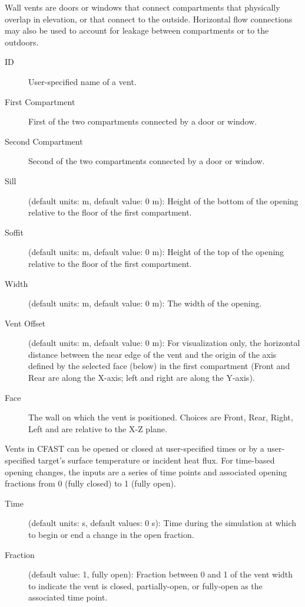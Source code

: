 Wall vents are doors or windows that connect compartments that physically overlap in elevation, or that connect to the outside. Horizontal flow connections may also be used to account for leakage between compartments or to the outdoors.

\begin{description}
\item[ID] User-specified name of a vent.
\item[First Compartment] First of the two compartments connected by a door or window.
\item[Second Compartment] Second of the two compartments connected by a door or window.
\item[Sill] (default units: m, default value: 0 m): Height of the bottom of the opening relative to the floor of the first compartment.
\item[Soffit] (default units: m, default value: 0 m): Height of the top of the opening relative to the floor of the first compartment.
\item[Width] (default units: m, default value: 0 m): The width of the opening.
\item[Vent Offset] (default units: m, default value: 0 m): For visualization only, the horizontal distance between the near edge of the vent and the origin of the axis defined by the selected face (below) in the first compartment (Front and Rear are along the X-axis; left and right are along the Y-axis).
\item[Face] The wall on which the vent is positioned.  Choices are Front, Rear, Right, Left and are relative to the X-Z plane.
\end{description}

Vents in CFAST can be opened or closed at user-specified times or by a user-specified target's surface temperature or incident heat flux. For time-based opening changes, the inputs are a series of time points and associated opening fractions from 0 (fully closed) to 1 (fully open).

\begin{description}
\item[Time] (default units: s, default values: 0 s): Time during the simulation at which to begin or end a change in the open fraction.
\item[Fraction] (default value: 1, fully open): Fraction between 0 and 1 of the vent width to indicate the vent is closed, partially-open, or fully-open as the associated time point.
\end{description}

